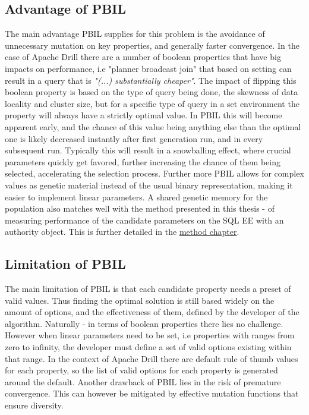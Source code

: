 \documentclass[a4paper,english]{report}
\begin{document}
		\subsection{Advantage of PBIL}
		The main advantage PBIL supplies for this problem is the avoidance of unnecessary mutation on key properties, and generally faster convergence. In the case of Apache Drill there are a number of boolean properties that have big impacts on performance, i.e "planner broadcast join" that based on setting can result in a query that is \textit{"(...) substantially cheaper"}\cite{joinplanning}. The impact of flipping this boolean property is based on the type of query being done, the skewness of data locality and cluster size, but for a specific type of query in a set environment the property will always have a strictly optimal value. In PBIL this will become apparent early, and the chance of this value being anything else than the optimal one is likely decreased instantly after first generation run, and in every subsequent run. Typically this will result in a snowballing effect, where crucial parameters quickly get favored, further increasing the chance of them being selected, accelerating the selection process. Further more PBIL allows for complex values as genetic material instead of the usual binary representation, making it easier to implement linear parameters. A shared genetic memory for the population also matches well with the method presented in this thesis - of measuring performance of the candidate parameters on the SQL EE with an authority object. This is further detailed in the \hyperref[sec:judge]{method chapter}.
		\subsection{Limitation of PBIL}
		The main limitation of PBIL is that each candidate property needs a preset of valid values. Thus finding the optimal solution is still based widely on the amount of options, and the effectiveness of them, defined by the developer of the algorithm. Naturally - in terms of boolean properties there lies no challenge. However when linear parameters need to be set, i.e properties with ranges from zero to infinity, the developer must define a set of valid options existing within that range. In the context of Apache Drill there are default rule of thumb values for each property, so the list of valid options for each property is generated around the default.
		Another drawback of PBIL lies in the risk of premature convergence. This can however be mitigated by effective mutation functions that ensure diversity.
	\pagebreak
\end{document}
